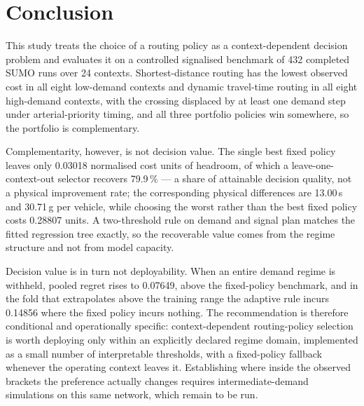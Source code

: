 \documentclass[runningheads]{llncs}
\begin{document}
\section{Conclusion}

This study treats the choice of a routing policy as a context-dependent decision problem
and evaluates it on a controlled signalised benchmark of 432 completed SUMO runs over 24
contexts. Shortest-distance routing has the lowest observed cost in all eight low-demand
contexts and dynamic travel-time routing in all eight high-demand contexts, with the
crossing displaced by at least one demand step under arterial-priority timing, and all
three portfolio policies win somewhere, so the portfolio is complementary.

Complementarity, however, is not decision value. The single best fixed policy leaves only
0.03018 normalised cost units of headroom, of which a leave-one-context-out selector
recovers 79.9\,\% --- a share of attainable decision quality, not a physical improvement
rate; the corresponding physical differences are 13.00\,s and 30.71\,g per vehicle, while
choosing the worst rather than the best fixed policy costs 0.28807 units. A two-threshold
rule on demand and signal plan matches the fitted regression tree exactly, so the
recoverable value comes from the regime structure and not from model capacity.

Decision value is in turn not deployability. When an entire demand regime is withheld,
pooled regret rises to 0.07649, above the fixed-policy benchmark, and in the fold that
extrapolates above the training range the adaptive rule incurs 0.14856 where the fixed
policy incurs nothing. The recommendation is therefore conditional and operationally
specific: context-dependent routing-policy selection is worth deploying only within an
explicitly declared regime domain, implemented as a small number of interpretable
thresholds, with a fixed-policy fallback whenever the operating context leaves it.
Establishing where inside the observed brackets the preference actually changes requires
intermediate-demand simulations on this same network, which remain to be run.



\end{document}
